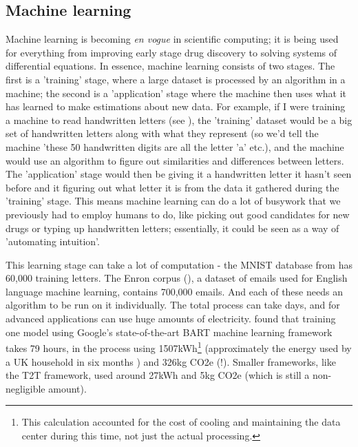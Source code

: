 \documentclass{article}
\begin{document}
\subsection{Machine learning}
Machine learning is becoming \textit{en vogue} in scientific computing; it is being used for everything from improving early stage drug discovery \citep{imrie2021generating} to solving systems of differential equations. \citep{bhattacharya2020model} In essence, machine learning consists of two stages. The first is a 'training' stage, where a large dataset is processed by an algorithm in a machine; the second is a 'application' stage where the machine then uses what it has learned to make estimations about new data. For example, if I were training a machine to read handwritten letters (see \citet{deng2012mnist}), the 'training' dataset would be a big set of handwritten letters along with what they represent (so we'd tell the machine 'these 50 handwritten digits are all the letter 'a' etc.), and the machine would use an algorithm to figure out similarities and differences between letters. The 'application' stage would then be giving it a handwritten letter it hasn't seen before and it figuring out what letter it is from the data it gathered during the 'training' stage. This means machine learning can do a lot of busywork that we previously had to employ humans to do, like picking out good candidates for new drugs or typing up handwritten letters; essentially, it could be seen as a way of 'automating intuition'. \newline

This learning stage can take a lot of computation - the MNIST database from \citet{deng2012mnist} has 60,000 training letters. The Enron corpus (\citet[see][]{klimt2004enron}), a dataset of emails used for English language machine learning, contains 700,000 emails. And each of these needs an algorithm to be run on it individually. The total process can take days, and for advanced applications can use  huge amounts of electricity. \citet{strubell2019energy} found that training one model using Google's state-of-the-art BART machine learning framework takes 79 hours, in the process using 1507kWh\footnote{This calculation accounted for the cost of cooling and maintaining the data center during this time, not just the actual processing.} (approximately the energy used by a UK household in six months \citep{waters2019energy}) and 326kg CO2e (!). Smaller frameworks, like the T2T framework, used around 27kWh and 5kg CO2e (which is still a non-negligible amount). \newline
\end{document}

